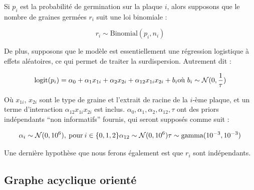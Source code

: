 \documentclass[
]{article}
\begin{document}
Si \(p_i\) est la probabilité de germination sur la plaque \(i\), alors
supposons que le nombre de graines germées \(r_i\) suit une loi
binomiale :

\[
r_i \sim \text{Binomial}(p_i,n_i)
\]

De plus, supposons que le modèle est essentiellement une régression
logistique à effets aléatoires, ce qui permet de traiter la
surdispersion. Autrement dit :

\[
  \text{logit}(p_i) = \alpha_0 + \alpha_1x_{1i} + \alpha_2x_{2i} + \alpha_{12}x_{1i}x_{2i} + b_i \\
  \text{où } b_i \sim \mathcal{N}(0,\frac{1}{\tau})
\]

Où \(x_{1i}\), \(x_{2i}\) sont le type de graine et l'extrait de racine
de la \(i\)-ème plaque, et un terme d'interaction
\(\alpha_{12}x_{1i}x_{2i}\) est inclus.
\(\alpha_0, \alpha_1, \alpha_2, \alpha_{12}, \tau\) ont des priors
indépendants ``non informatifs'' fournis, qui seront supposés comme suit
:

\[
  \alpha_i \sim \mathcal{N}(0, 10^6), \: \text{pour} \: i \in \{0, 1, 2\} \\
  \alpha_{12} \sim \mathcal{N}(0, 10^6) \\
  \tau \sim \text{gamma}(10^{-3}, 10^{-3})
\]

Une dernière hypothèse que nous ferons également est que \(r_i\) sont
indépendants.

\hypertarget{graphe-acyclique-orientuxe9}{%
\subsection{Graphe acyclique
orienté}\label{graphe-acyclique-orientuxe9}}
\end{document}
